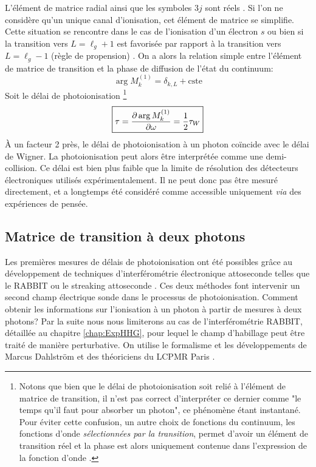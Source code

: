 L'élément de matrice radial ainsi que les symboles $3j$ sont réels . Si l'on ne considère qu'un unique canal d'ionisation, cet élément de matrice se simplifie. Cette situation se rencontre dans le cas de l'ionisation d'un électron $s$ ou bien si la transition vers $L = \ell_g + 1$ est favorisée par rapport à la transition vers $L = \ell_g - 1$ (règle de propension) . On a alors la relation simple entre l'élément de matrice de transition et la phase de diffusion de l'état du continuum:
\begin{equation}
\arg M^{(1)}_{k} = \delta_{k,L} + \text{cste}
\end{equation}
Soit le délai de photoionisation \footnote{Notons que bien que le délai de photoionisation soit relié à l'élément de matrice de transition, il n'est pas correct d'interpréter ce dernier comme "le temps qu'il faut pour absorber un photon", ce phénomène étant instantané. Pour éviter cette confusion, un autre choix de fonctions du continuum, les fonctions d'onde \textit{sélectionnées par la transition}, permet d'avoir un élément de transition réel et la phase est alors uniquement contenue dans l'expression de la fonction d'onde .}
\begin{equation}
\setlength\fboxrule{0.5pt}
\boxed{
\tau = \frac{\partial \arg M^{(1)}_{k}}{\partial \omega} = \frac{1}{2} \tau_W
}
\end{equation}
\`A un facteur 2 près, le délai de photoionisation à un photon coïncide avec le délai de Wigner. La photoionisation peut alors être interprétée comme une demi-collision. Ce délai est bien plus faible que la limite de résolution des détecteurs électroniques utilisés expérimentalement. Il ne peut donc pas être mesuré directement, et a longtemps été considéré comme accessible uniquement \textit{via} des expériences de pensée.

\subsection{Matrice de transition à deux photons}
\label{sec:Matrice2photons}
Les premières mesures de délais de photoionisation ont été possibles grâce au développement de techniques d'interférométrie électronique attoseconde telles que le RABBIT  ou le streaking attoseconde . Ces deux méthodes font intervenir un second champ électrique sonde dans le processus de photoionisation. Comment obtenir les informations sur l'ionisation à un photon à partir de mesures à deux photons? Par la suite nous nous limiterons au cas de l'interférométrie RABBIT, détaillée au chapitre \ref{chap:ExpHHG}, pour lequel le champ d'habillage peut être traité de manière perturbative. On utilise le formalisme et les développements de Marcus Dahlström et des théoriciens du LCPMR Paris .

